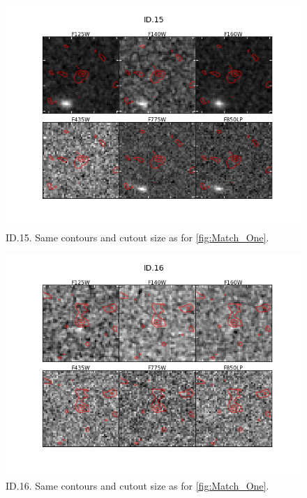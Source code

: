 \begin{figure}[tbp]
\centering \includegraphics[width=160mm]{Matched/ASPECS_Cutout_14.png}
\caption{ID.15. Same contours and cutout size as for \ref{fig:Match_One}.}
\label{fig:Match_Three}
\end{figure}

\begin{figure}[tbp]
\centering \includegraphics[width=160mm]{Matched/ASPECS_Cutout_15.png}
\caption{ID.16. Same contours and cutout size as for \ref{fig:Match_One}.}
\label{fig:Match_Three}
\end{figure}

